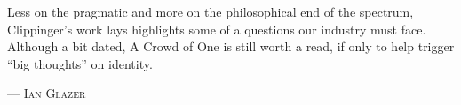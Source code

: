 Less on the pragmatic and more on the philosophical end of the spectrum, Clippinger’s work lays highlights some of a questions our industry must face. Although a bit dated, A Crowd of One is still worth a read, if only to help trigger “big thoughts” on identity. 
\setlength{\parindent}{0cm}\par\textsc{ --- Ian Glazer }\par\vspace{12pt}\setlength{\parindent}{15pt}
